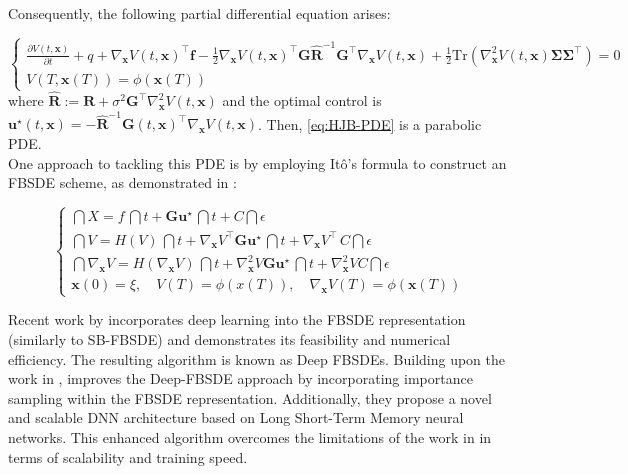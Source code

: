 \documentclass{article}
\begin{document}
Consequently, the following partial differential equation arises:

\begin{equation}
    \label{eq:HJB-PDE}\tag{PDE-HJB}
    \begin{cases}
            \displaystyle \frac{\partial V(t,\mathbf{x})}{\partial t}
            + q
            + \nabla_\mathbf{x} V(t,\mathbf{x})^\top \mathbf{f}
            - \frac{1}{2}\nabla_\mathbf{x}V(t,\mathbf{x})^\top \mathbf{G}\hat{\mathbf{R}}^{-1}\mathbf{G}^\top \nabla_\mathbf{x}V(t,\mathbf{x})
            + \frac{1}{2}\mathrm{Tr}(\nabla_\mathbf{x}^2 V(t,\mathbf{x})\mathbf{\Sigma}\mathbf{\Sigma}^\top)
            = 0
        \\[7pt]
        \displaystyle V(T,\mathbf{x}(T))  = \phi(\mathbf{x}(T))
    \end{cases}
\end{equation}
where $\hat{\mathbf{R}} := \mathbf{R} + \sigma^2 \mathbf{G}^\top \nabla_\mathbf{x}^2 V(t,\mathbf{x})$ and the optimal control is $\mathbf{u}^\star(t,\mathbf{x}) =  - \hat{\mathbf{R}}^{-1}\mathbf{G}(t,\mathbf{x})^\top \nabla_\mathbf{x}V(t,\mathbf{x})$. Then, \ref{eq:HJB-PDE} is a parabolic PDE. \\

One approach to tackling this PDE is by employing Itô's formula to construct an FBSDE scheme, as demonstrated in \cite{pereira2019deep}:

\begin{equation}
\begin{cases}
    \displaystyle \dint X
    = f \, \dint t
    + \mathbf{G}\mathbf{u}^\star \, \dint t
    + C \dint \epsilon
    \\[7pt]
    \displaystyle \dint V
    = H(V) \, \dint t
    + \nabla_\mathbf{x}V^\top \mathbf{G}\mathbf{u}^\star \, \dint t
    + \nabla_\mathbf{x}V^\top \, C \dint \epsilon
    \\[7pt]
    \displaystyle
    \dint \nabla_\mathbf{x}V
    = H(\nabla_\mathbf{x}V) \, \dint t
    + \nabla^2_\mathbf{x}V \mathbf{G}\mathbf{u}^\star \, \dint t
    + \nabla^2_\mathbf{x} V C \dint \epsilon
    \\[7pt]
    \displaystyle
    \mathbf{x}(0) = \xi,
    \quad V(T) = \phi(x(T)),
    \quad \nabla_\mathbf{x}V(T) = \phi(\mathbf{x}(T))
\end{cases}
\end{equation}

Recent work by \cite{Han_2018} incorporates deep learning into the FBSDE representation (similarly to SB-FBSDE) and demonstrates its feasibility and numerical efficiency. The resulting algorithm is known as Deep FBSDEs. Building upon the work in \cite{Han_2018}, \cite{Wang_2019} improves the Deep-FBSDE approach by incorporating importance sampling within the FBSDE representation. Additionally, they propose a novel and scalable DNN architecture based on Long Short-Term Memory neural networks. This enhanced algorithm overcomes the limitations of the work in \cite{Han_2018} in terms of scalability and training speed.
\end{document}
